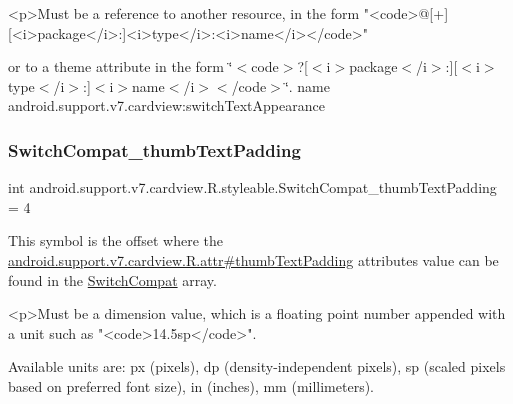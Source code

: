 \begin{DoxyVerb}      <p>Must be a reference to another resource, in the form "<code>@[+][<i>package</i>:]<i>type</i>:<i>name</i></code>"
\end{DoxyVerb}
 or to a theme attribute in the form \char`\"{}$<$code$>$?\mbox{[}$<$i$>$package$<$/i$>$\+:\mbox{]}\mbox{[}$<$i$>$type$<$/i$>$\+:\mbox{]}$<$i$>$name$<$/i$>$$<$/code$>$\char`\"{}.  name android.\+support.\+v7.\+cardview\+:switch\+Text\+Appearance \mbox{\label{classandroid_1_1support_1_1v7_1_1cardview_1_1R_1_1styleable_ab38025adbf83386aabd5df58f36bd8cb}} 
\subsubsection{\texorpdfstring{Switch\+Compat\+\_\+thumb\+Text\+Padding}{SwitchCompat\_thumbTextPadding}}
{\footnotesize\ttfamily int android.\+support.\+v7.\+cardview.\+R.\+styleable.\+Switch\+Compat\+\_\+thumb\+Text\+Padding = 4\hspace{0.3cm}{\ttfamily [static]}}

This symbol is the offset where the \hyperlink{classandroid_1_1support_1_1v7_1_1cardview_1_1R_1_1attr_abf506594cf166db51e2592071996565b}{android.\+support.\+v7.\+cardview.\+R.\+attr\#thumb\+Text\+Padding} attribute\textquotesingle{}s value can be found in the \hyperlink{classandroid_1_1support_1_1v7_1_1cardview_1_1R_1_1styleable_a8b1fbe9bb91473a7977ff98951ed5255}{Switch\+Compat} array.

\begin{DoxyVerb}      <p>Must be a dimension value, which is a floating point number appended with a unit such as "<code>14.5sp</code>".
\end{DoxyVerb}
 Available units are\+: px (pixels), dp (density-\/independent pixels), sp (scaled pixels based on preferred font size), in (inches), mm (millimeters). 


